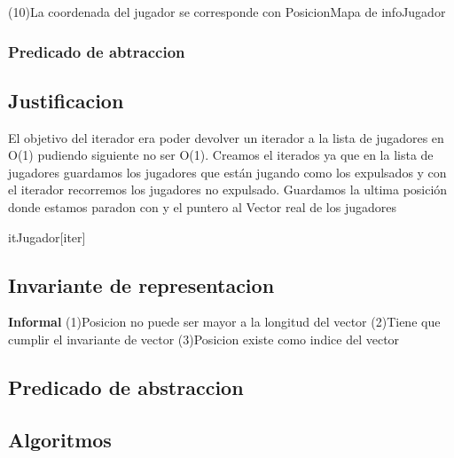 \begin{Representacion}
(10)La coordenada del jugador se corresponde con PosicionMapa de infoJugador\\

\subsubsection{Predicado de abtraccion}


\subsection{Justificacion}
	El objetivo del iterador era poder devolver un iterador a la lista de jugadores en O(1) pudiendo siguiente no ser O(1). Creamos el iterados ya que en la lista de jugadores guardamos los jugadores que est\'an jugando como los expulsados y con el iterador recorremos los jugadores no expulsado. Guardamos la ultima posici\'on donde estamos paradon con y el puntero al Vector real de los jugadores
	
	\begin{Estructura}{itJugador}[iter]
		\begin{Tupla}[iter]
		\end{Tupla}
	\end{Estructura}
\subsection{Invariante de representacion}

\textbf{Informal}
(1)Posicion no puede ser mayor a la longitud del vector
(2)Tiene que cumplir el invariante de vector
(3)Posicion existe como indice del vector

\subsection{Predicado de abstraccion}

\end{Representacion}
\subsection{Algoritmos}


